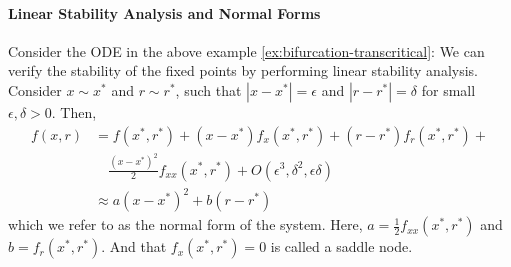 \documentclass[11pt]{article}
\begin{document}
\paragraph{Linear Stability Analysis and Normal Forms} Consider the ODE in the above example \ref{ex:bifurcation-transcritical}:
We can verify the stability of the fixed points by performing linear stability analysis. Consider $x \sim x^*$ and $r \sim r^*$, such that $|x - x^*| = \epsilon$ and $|r - r^*| = \delta$ for small $\epsilon, \delta > 0$. Then,
\begin{align*}
    f(x, r) &= f(x^*, r^*) + (x-x^*) f_x(x^*, r^*) + (r-r^*) f_r(x^*, r^*) + \\
    &\quad \frac{(x-x^*)^2}{2} f_{xx}(x^*, r^*) + O(\epsilon^3, \delta^2, \epsilon\delta) \\
    &\approx a(x - x^*)^2 + b(r - r^*)
\end{align*}
which we refer to as the normal form of the system. Here, \( a = \frac{1}{2} f_{xx}(x^*, r^*) \) and \( b = f_r(x^*, r^*) \). And that $f_x(x^*, r^*) = 0$ is called a saddle node.
\end{document}
